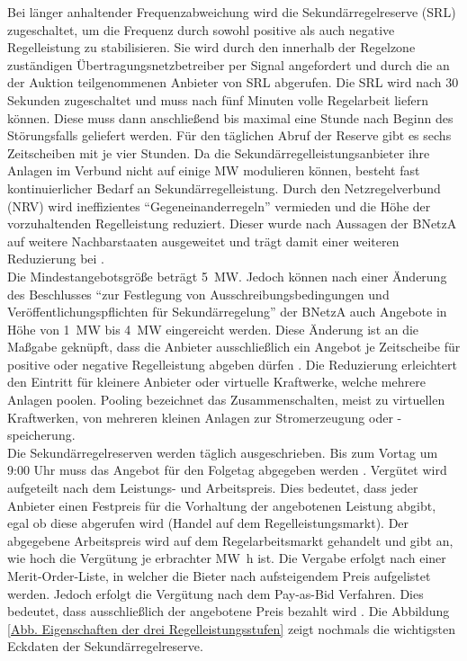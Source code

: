 			Bei länger anhaltender Frequenzabweichung wird die Sekundärregelreserve (SRL) zugeschaltet, um die Frequenz durch sowohl positive als auch negative Regelleistung zu stabilisieren.
			Sie wird durch den innerhalb der Regelzone zuständigen Übertragungsnetzbetreiber per Signal angefordert und durch die an der Auktion teilgenommenen Anbieter von SRL abgerufen. 
			Die SRL wird nach \num{30} Sekunden zugeschaltet und muss nach fünf Minuten volle Regelarbeit liefern können. 
			Diese muss dann anschließend bis maximal eine Stunde nach Beginn des Störungsfalls geliefert werden. 
			Für den täglichen Abruf der Reserve gibt es sechs Zeitscheiben mit je vier Stunden.
			Da die Sekundärregelleistungsanbieter ihre Anlagen im Verbund nicht auf einige \si{\mega\watt} modulieren können, besteht fast kontinuierlicher Bedarf an Sekundärregelleistung.
			Durch den Netzregelverbund (NRV) wird ineffizientes "`Gegeneinanderregeln"' vermieden und die Höhe der vorzuhaltenden Regelleistung reduziert.
			Dieser wurde nach Aussagen der BNetzA auf weitere Nachbarstaaten ausgeweitet und trägt damit einer weiteren Reduzierung bei \cite[S. 207 f.]{Monitoringbericht_BNetzA}. \\
			
			Die Mindestangebotsgröße beträgt \SI{5}{\mega\watt}.
			Jedoch können nach einer Änderung des Beschlusses "`zur Festlegung von Ausschreibungsbedingungen und Veröffentlichungspflichten für Sekundärregelung"' der BNetzA auch Angebote in Höhe von \SI{1}{\mega\watt} bis \SI{4}{\mega\watt} eingereicht werden.
			Diese Änderung ist an die Maßgabe geknüpft, dass die Anbieter ausschließlich ein Angebot je Zeitscheibe für positive oder negative Regelleistung abgeben dürfen \cite{Beschluss_SRL}.
			Die Reduzierung erleichtert den Eintritt für kleinere Anbieter oder virtuelle Kraftwerke, welche mehrere Anlagen poolen.
			Pooling bezeichnet das Zusammenschalten, meist zu virtuellen Kraftwerken, von mehreren kleinen Anlagen zur Stromerzeugung oder -speicherung. \\
			
			Die Sekundärregelreserven werden täglich ausgeschrieben. 
			Bis zum Vortag um 9:00 Uhr muss das Angebot für den Folgetag abgegeben werden \cite{regelleistungnet_PRL_Ausschreibung}.
			Vergütet wird aufgeteilt nach dem Leistungs- und Arbeitspreis.
			Dies bedeutet, dass jeder Anbieter einen Festpreis für die Vorhaltung der angebotenen Leistung abgibt, egal ob diese abgerufen wird (Handel auf dem Regelleistungsmarkt).
			Der abgegebene Arbeitspreis wird auf dem Regelarbeitsmarkt gehandelt und gibt an, wie hoch die Vergütung je erbrachter \si{\mega\watt\hour} ist.
			Die Vergabe erfolgt nach einer Merit-Order-Liste, in welcher die Bieter nach aufsteigendem Preis aufgelistet werden.
			Jedoch erfolgt die Vergütung nach dem Pay-as-Bid Verfahren.
			Dies bedeutet, dass ausschließlich der angebotene Preis bezahlt wird \cite[S. 81 ff.]{Doktorarbeit_Reitsam}.
			Die Abbildung \ref{Abb. Eigenschaften der drei Regelleistungsstufen} zeigt nochmals die wichtigsten Eckdaten der Sekundärregelreserve.
			
